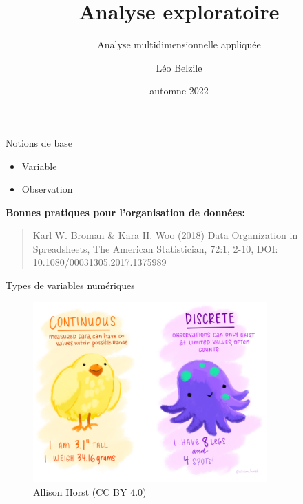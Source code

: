 \documentclass[
  ignorenonframetext,
]{beamer}
\title{Analyse exploratoire}
\subtitle{Analyse multidimensionnelle appliquée}
\author{Léo Belzile}
\date{automne 2022}
\institute{HEC Montréal}
\providecommand{\tightlist}{%
  \setlength{\itemsep}{0pt}\setlength{\parskip}{0pt}}\usepackage{longtable,booktabs,array}
\begin{document}
\frame{\titlepage}
\ifdefined\Shaded\renewenvironment{Shaded}{\begin{tcolorbox}[boxrule=0pt, interior hidden, sharp corners, borderline west={3pt}{0pt}{shadecolor}, enhanced, frame hidden, breakable]}{\end{tcolorbox}}\fi

\begin{frame}{Notions de base}
\protect\hypertarget{notions-de-base}{}
\begin{itemize}
\tightlist
\item
  Variable
\item
  Observation
\end{itemize}

\textbf{Bonnes pratiques pour l'organisation de données:}

\begin{quote}
Karl W. Broman \& Kara H. Woo (2018) Data Organization in Spreadsheets,
The American Statistician, 72:1, 2-10, DOI:
10.1080/00031305.2017.1375989
\end{quote}
\end{frame}

\begin{frame}{Types de variables numériques}
\protect\hypertarget{types-de-variables-numuxe9riques}{}
\begin{figure}

{\centering \includegraphics[width=0.8\textwidth,height=\textheight]{figures/continuous_discrete.png}

}

\caption{Allison Horst (CC BY 4.0)}

\end{figure}
\end{frame}
\end{document}
